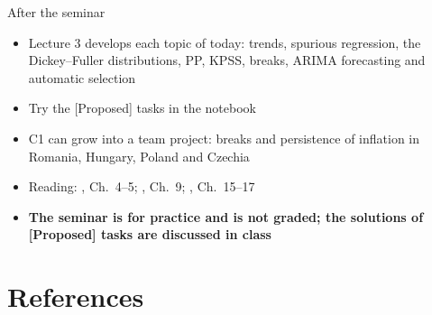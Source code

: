 \begin{frame}{After the seminar}
\itemsize{\small}
\begin{itemize}
    \item Lecture 3 develops each topic of today: trends, spurious regression, the Dickey--Fuller distributions, PP, KPSS, breaks, ARIMA forecasting and automatic selection
    \item Try the [Proposed] tasks in the notebook
    \item C1 can grow into a team project: breaks and persistence of inflation in Romania, Hungary, Poland and Czechia
    \item Reading: , Ch.~4--5; , Ch.~9; , Ch.~15--17
    \item \textbf{The seminar is for practice and is not graded; the solutions of [Proposed] tasks are discussed in class}
\end{itemize}
\end{frame}


\section{References}

